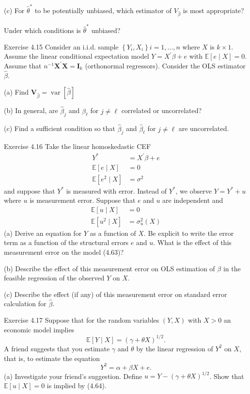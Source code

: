 \documentclass[10pt]{article}
\begin{document}
(c) For $\widehat{\theta}^{*}$ to be potentially unbiased, which estimator of $V_{\widehat{\beta}}$ is most appropriate?

Under which conditions is $\widehat{\theta}^{*}$ unbiased?

Exercise 4.15 Consider an i.i.d. sample $\left\{Y_{i}, X_{i}\right\} i=1, \ldots, n$ where $X$ is $k \times 1$. Assume the linear conditional expectation model $Y=X^{\prime} \beta+e$ with $\mathbb{E}[e \mid X]=0$. Assume that $n^{-1} \boldsymbol{X}^{\prime} \boldsymbol{X}=\boldsymbol{I}_{k}$ (orthonormal regressors). Consider the OLS estimator $\widehat{\beta}$.

(a) Find $\boldsymbol{V}_{\widehat{\beta}}=\operatorname{var}[\widehat{\beta}]$

(b) In general, are $\widehat{\beta}_{j}$ and $\widehat{\beta}_{\ell}$ for $j \neq \ell$ correlated or uncorrelated?

(c) Find a sufficient condition so that $\widehat{\beta}_{j}$ and $\widehat{\beta}_{\ell}$ for $j \neq \ell$ are uncorrelated.

Exercise 4.16 Take the linear homoskedastic CEF
$$
\begin{aligned}
Y^{*} &=X^{\prime} \beta+e \\
\mathbb{E}[e \mid X] &=0 \\
\mathbb{E}\left[e^{2} \mid X\right] &=\sigma^{2}
\end{aligned}
$$
and suppose that $Y^{*}$ is measured with error. Instead of $Y^{*}$, we observe $Y=Y^{*}+u$ where $u$ is measurement error. Suppose that $e$ and $u$ are independent and
$$
\begin{aligned}
\mathbb{E}[u \mid X] &=0 \\
\mathbb{E}\left[u^{2} \mid X\right] &=\sigma_{u}^{2}(X)
\end{aligned}
$$
(a) Derive an equation for $Y$ as a function of $X$. Be explicit to write the error term as a function of the structural errors $e$ and $u$. What is the effect of this measurement error on the model (4.63)?

(b) Describe the effect of this measurement error on OLS estimation of $\beta$ in the feasible regression of the observed $Y$ on $X$.

(c) Describe the effect (if any) of this measurement error on standard error calculation for $\widehat{\beta}$.

Exercise 4.17 Suppose that for the random variables $(Y, X)$ with $X>0$ an economic model implies
$$
\mathbb{E}[Y \mid X]=(\gamma+\theta X)^{1 / 2} .
$$
A friend suggests that you estimate $\gamma$ and $\theta$ by the linear regression of $Y^{2}$ on $X$, that is, to estimate the equation
$$
Y^{2}=\alpha+\beta X+e .
$$
(a) Investigate your friend's suggestion. Define $u=Y-(\gamma+\theta X)^{1 / 2}$. Show that $\mathbb{E}[u \mid X]=0$ is implied by (4.64).
\end{document}
